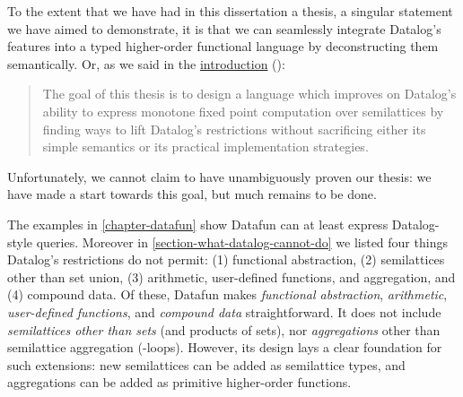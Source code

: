 


\noindent
To the extent that we have had in this dissertation a thesis, a singular statement
we have aimed to demonstrate, it is that we can seamlessly integrate Datalog's
features into a typed higher-order functional language by deconstructing them
semantically.
%
Or, as we said in the \hyperref[goal-of-thesis]{introduction}
():

\begin{quote}
  The goal of this thesis is to design a language which improves on Datalog's
  ability to express monotone fixed point computation over semilattices by
  finding ways to lift Datalog's restrictions without sacrificing either its
  simple semantics or its practical implementation strategies.
\end{quote}

\noindent
Unfortunately, we cannot claim to have unambiguously proven our thesis: we have
made a start towards this goal, but much remains to be done.

The examples in \cref{chapter-datafun} show Datafun can at least express
Datalog-style queries. Moreover in \cref{section-what-datalog-cannot-do} we
listed four things Datalog's restrictions do not permit: (1) functional
abstraction, (2) semilattices other than set union, (3) arithmetic, user-defined
functions, and aggregation, and (4) compound data.
%
Of these, Datafun makes \emph{functional abstraction}, \emph{arithmetic}, \emph{user-defined functions}, and \emph{compound data} straightforward.
%
It does not include \emph{semilattices other than sets} (and products of sets),
nor \emph{aggregations} other than semilattice aggregation (-loops).
%
However, its design lays a clear foundation for such extensions: new
semilattices can be added as semilattice types, and aggregations can be added as
primitive higher-order functions.
%

